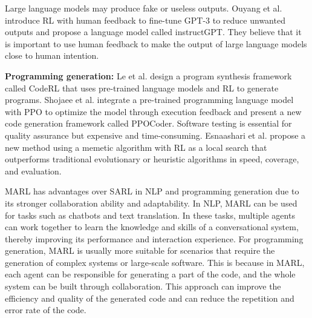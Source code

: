 \documentclass[acmsmall]{acmart}
\begin{document}
Large language models may produce fake or useless outputs. Ouyang et al. \cite{NEURIPS2022_b1efde53} introduce RL with human feedback to fine-tune GPT-3 to reduce unwanted outputs and propose a language model called instructGPT. They believe that it is important to use human feedback to make the output of large language models close to human intention. 

\textbf{Programming generation: }
Le et al. \cite{NEURIPS2022_8636419d} design a program synthesis framework called CodeRL that uses pre-trained language models and RL to generate programs.%
Shojaee et al. \cite{shojaee2023execution} integrate a pre-trained programming language model with PPO to optimize the model through execution feedback and present a new code generation framework called PPOCoder. %
Software testing is essential for quality assurance but expensive and time-consuming. Esnaashari et al. \cite{ESNAASHARI2021115446} propose a new method using a memetic algorithm with RL as a local search that outperforms traditional evolutionary or heuristic algorithms in speed, coverage, and evaluation.

MARL has advantages over SARL in  NLP and programming generation due to its stronger collaboration ability and adaptability. In NLP, MARL can be used for tasks such as chatbots and text translation. In these tasks, multiple agents can work together to learn the knowledge and skills of a conversational system, thereby improving its performance and interaction experience. For programming generation, MARL is usually more suitable for scenarios that require the generation of complex systems or large-scale software. This is because in MARL, each agent can be responsible for generating a part of the code, and the whole system can be built through collaboration. This approach can improve the efficiency and quality of the generated code and can reduce the repetition and error rate of the code.
\end{document}

